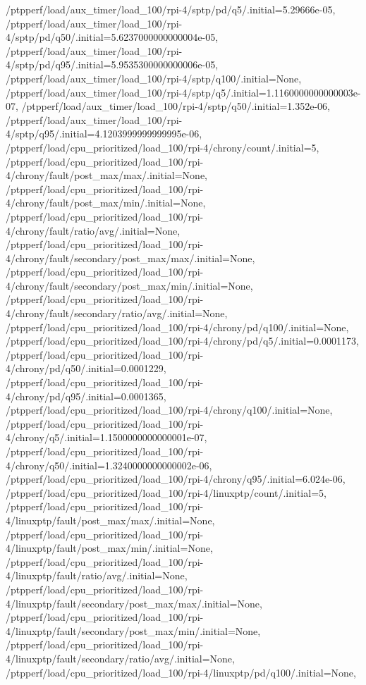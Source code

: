 {    /ptpperf/load/aux_timer/load_100/rpi-4/sptp/pd/q5/.initial=5.29666e-05,
    /ptpperf/load/aux_timer/load_100/rpi-4/sptp/pd/q50/.initial=5.6237000000000004e-05,
    /ptpperf/load/aux_timer/load_100/rpi-4/sptp/pd/q95/.initial=5.9535300000000006e-05,
    /ptpperf/load/aux_timer/load_100/rpi-4/sptp/q100/.initial=None,
    /ptpperf/load/aux_timer/load_100/rpi-4/sptp/q5/.initial=1.1160000000000003e-07,
    /ptpperf/load/aux_timer/load_100/rpi-4/sptp/q50/.initial=1.352e-06,
    /ptpperf/load/aux_timer/load_100/rpi-4/sptp/q95/.initial=4.1203999999999995e-06,
    /ptpperf/load/cpu_prioritized/load_100/rpi-4/chrony/count/.initial=5,
    /ptpperf/load/cpu_prioritized/load_100/rpi-4/chrony/fault/post_max/max/.initial=None,
    /ptpperf/load/cpu_prioritized/load_100/rpi-4/chrony/fault/post_max/min/.initial=None,
    /ptpperf/load/cpu_prioritized/load_100/rpi-4/chrony/fault/ratio/avg/.initial=None,
    /ptpperf/load/cpu_prioritized/load_100/rpi-4/chrony/fault/secondary/post_max/max/.initial=None,
    /ptpperf/load/cpu_prioritized/load_100/rpi-4/chrony/fault/secondary/post_max/min/.initial=None,
    /ptpperf/load/cpu_prioritized/load_100/rpi-4/chrony/fault/secondary/ratio/avg/.initial=None,
    /ptpperf/load/cpu_prioritized/load_100/rpi-4/chrony/pd/q100/.initial=None,
    /ptpperf/load/cpu_prioritized/load_100/rpi-4/chrony/pd/q5/.initial=0.0001173,
    /ptpperf/load/cpu_prioritized/load_100/rpi-4/chrony/pd/q50/.initial=0.0001229,
    /ptpperf/load/cpu_prioritized/load_100/rpi-4/chrony/pd/q95/.initial=0.0001365,
    /ptpperf/load/cpu_prioritized/load_100/rpi-4/chrony/q100/.initial=None,
    /ptpperf/load/cpu_prioritized/load_100/rpi-4/chrony/q5/.initial=1.1500000000000001e-07,
    /ptpperf/load/cpu_prioritized/load_100/rpi-4/chrony/q50/.initial=1.3240000000000002e-06,
    /ptpperf/load/cpu_prioritized/load_100/rpi-4/chrony/q95/.initial=6.024e-06,
    /ptpperf/load/cpu_prioritized/load_100/rpi-4/linuxptp/count/.initial=5,
    /ptpperf/load/cpu_prioritized/load_100/rpi-4/linuxptp/fault/post_max/max/.initial=None,
    /ptpperf/load/cpu_prioritized/load_100/rpi-4/linuxptp/fault/post_max/min/.initial=None,
    /ptpperf/load/cpu_prioritized/load_100/rpi-4/linuxptp/fault/ratio/avg/.initial=None,
    /ptpperf/load/cpu_prioritized/load_100/rpi-4/linuxptp/fault/secondary/post_max/max/.initial=None,
    /ptpperf/load/cpu_prioritized/load_100/rpi-4/linuxptp/fault/secondary/post_max/min/.initial=None,
    /ptpperf/load/cpu_prioritized/load_100/rpi-4/linuxptp/fault/secondary/ratio/avg/.initial=None,
    /ptpperf/load/cpu_prioritized/load_100/rpi-4/linuxptp/pd/q100/.initial=None,
}

